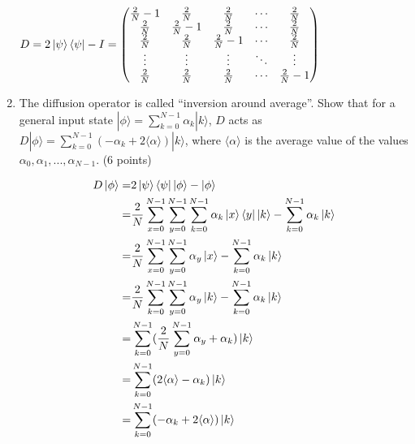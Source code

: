 \documentclass[12pt]{article}
\begin{document}
\begin{enumerate}
          $D = 2\ket{\psi}\bra{\psi}-I = \begin{pmatrix}
                  \frac{2}{N}-1 & \frac{2}{N}   & \frac{2}{N}   & \cdots & \frac{2}{N}   \\
                  \frac{2}{N}   & \frac{2}{N}-1 & \frac{2}{N}   & \cdots & \frac{2}{N}   \\
                  \frac{2}{N}   & \frac{2}{N}   & \frac{2}{N}-1 & \cdots & \frac{2}{N}   \\
                  \vdots        & \vdots        & \vdots        & \ddots & \vdots        \\
                  \frac{2}{N}   & \frac{2}{N}   & \frac{2}{N}   & \cdots & \frac{2}{N}-1
              \end{pmatrix}$
    \item The diffusion operator is called “inversion around average”. Show that for a general input state $|\phi\rangle = \sum_{k=0}^{N-1} \alpha_k |k\rangle$, $D$ acts as $D|\phi\rangle = \sum_{k=0}^{N-1} (-\alpha_k + 2\langle\alpha\rangle) |k\rangle$, where $\langle\alpha\rangle$ is the average value of the values $\alpha_0, \alpha_1, ..., \alpha_{N-1}$. (6 points)



          \begin{align}
              D\ket{\phi} = & 2\ket{\psi}\bra{\psi}\ket{\phi}-\ket{\phi}                                                                               \\
              =             & \frac{2}{N}\sum_{x=0}^{N-1}\sum_{y=0}^{N-1}\sum_{k=0}^{N-1}\alpha_k\ket{x}\bra{y}\ket{k}-\sum_{k=0}^{N-1}\alpha_k\ket{k} \\
              =             & \frac{2}{N}\sum_{x=0}^{N-1}\sum_{y=0}^{N-1}\alpha_y\ket{x}-\sum_{k=0}^{N-1}\alpha_k\ket{k}                               \\
              =             & \frac{2}{N}\sum_{k=0}^{N-1}\sum_{y=0}^{N-1}\alpha_y\ket{k}-\sum_{k=0}^{N-1}\alpha_k\ket{k}                               \\
              =             & \sum_{k=0}^{N-1}(\frac{2}{N}\sum_{y=0}^{N-1}\alpha_y+\alpha_k)\ket{k}                                                    \\
              =             & \sum_{k=0}^{N-1}(2\langle\alpha\rangle-\alpha_k)\ket{k}                                                                  \\
              =             & \sum_{k=0}^{N-1}(-\alpha_k+2\langle\alpha\rangle)\ket{k}
          \end{align}





\end{enumerate}
\end{document}
